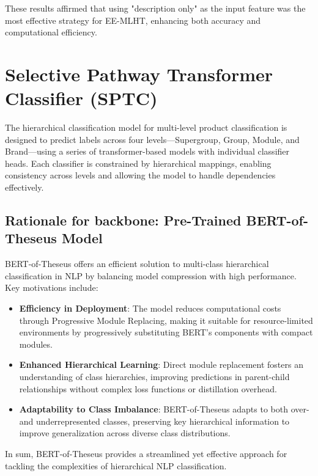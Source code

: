 \documentclass[9pt,a4paper,twoside]{rho-class/rho}
\begin{document}
    These results affirmed that using "description only" as the input feature was the most effective strategy for EE-MLHT, enhancing both accuracy and computational efficiency.

\section{Selective Pathway Transformer Classifier (SPTC)}

The hierarchical classification model for multi-level product classification is designed to predict labels across four levels—Supergroup, Group, Module, and Brand—using a series of transformer-based models with individual classifier heads. Each classifier is constrained by hierarchical mappings, enabling consistency across levels and allowing the model to handle dependencies effectively.

    \subsection{\textbf{Rationale for backbone: Pre-Trained BERT-of-Theseus Model}}

        BERT-of-Theseus offers an efficient solution to multi-class hierarchical classification in NLP by balancing model compression with high performance. Key motivations include:

\begin{itemize}
    \item \textbf{Efficiency in Deployment}: The model reduces computational costs through Progressive Module Replacing, making it suitable for resource-limited environments by progressively substituting BERT’s components with compact modules.

    \item \textbf{Enhanced Hierarchical Learning}: Direct module replacement fosters an understanding of class hierarchies, improving predictions in parent-child relationships without complex loss functions or distillation overhead.
    
    \item \textbf{Adaptability to Class Imbalance}: BERT-of-Theseus adapts to both over- and underrepresented classes, preserving key hierarchical information to improve generalization across diverse class distributions.
\end{itemize}

In sum, BERT-of-Theseus provides a streamlined yet effective approach for tackling the complexities of hierarchical NLP classification.
\end{document}
